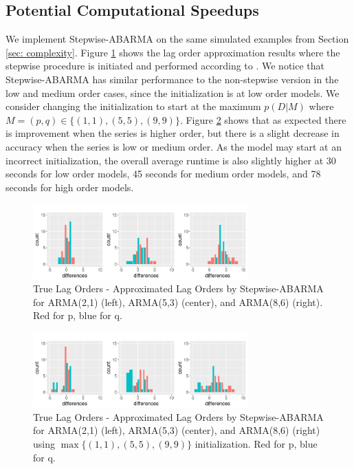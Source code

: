 \subsection{Potential Computational Speedups}
\label{sec:speedups}
We implement Stepwise-ABARMA on the same simulated examples from Section \ref{sec: complexity}.  Figure \ref{stepwise} shows the lag order approximation results where the stepwise procedure is initiated and performed according to \cite{hyndman2008}. We notice that Stepwise-ABARMA has similar performance to the non-stepwise version in the low and medium order cases, since the initialization is at low order models.  We consider changing the initialization to start at the maximum $p(D|M)$ where $M = (p,q) \in \{(1,1), (5,5), (9,9)\}$.   Figure \ref{stepwise2} shows that as expected there is improvement when the series is higher order, but there is a slight decrease in accuracy when the series is low or medium order.  As the model may start at an incorrect initialization, the overall average runtime is also slightly higher at 30 seconds for low order models, 45 seconds for medium order models, and 78 seconds for high order models. 

\begin{figure}
    \centering
    \includegraphics[width=3.25in]{stepwise.png}
    \caption{True Lag Orders - Approximated Lag Orders by Stepwise-ABARMA for ARMA(2,1) (left), ARMA(5,3) (center), and ARMA(8,6) (right). Red for p, blue for q.}
    \label{stepwise}
\end{figure}


\begin{figure}
    \centering
    \includegraphics[width=3.25in]{stepwise2.png}
    \caption{True Lag Orders - Approximated Lag Orders by Stepwise-ABARMA for ARMA(2,1) (left), ARMA(5,3) (center), and ARMA(8,6) (right) using $\max\{(1,1), (5,5), (9,9)\}$ initialization. Red for p, blue for q.}
    \label{stepwise2}
\end{figure}

